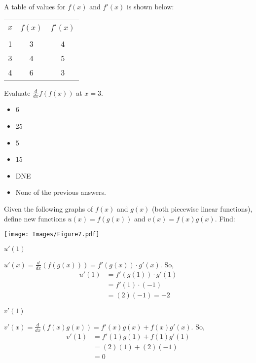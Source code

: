 \documentclass[handout,nooutcomes]{ximera}
\renewenvironment{freeResponse}{
\ifhandout\setbox0\vbox\bgroup\else
\begin{trivlist}\item[\hskip \labelsep\bfseries Solution:\hspace{2ex}]
\fi}
{\ifhandout\egroup\else
\end{trivlist}
\fi}
\newcommand{\ddx}{\frac{d}{dx}}
\begin{document}
\begin{problem}
  A table of values for $f(x)$ and $f'(x)$ is shown below:

  \begin{centering}
    \begin{tabular}{ccc}
      \toprule\\
      $x$ & $f(x)$ & $f'(x)$ \\
      \midrule\\
      1 & 3 & 4\\
      3 & 4 & 5\\
      4 & 6 & 3\\
      \bottomrule
    \end{tabular}
  \end{centering}

  Evaluate $\displaystyle\ddx f(f(x))$ at $x = 3$.
  \begin{itemize}
    \item[(a)] 6
    \item[(b)] 25
    \item[(c)] 5
    \item[(d)] 15
    \item[(e)] DNE
    \item[(f)] None of the previous answers.
  \end{itemize}
\end{problem}

\begin{problem}
  Given the following graphs of $f(x)$ and $g(x)$ (both piecewise
  linear functions), define new functions $u(x) = f(g(x))$ and
  $v(x) = f(x)g(x)$.  Find:

  \begin{image}
    \texttt{[image: Images/Figure7.pdf]}
  \end{image}

  \begin{enumerate}
	
  \item $u'(1)$
    \begin{freeResponse}
      $u'(x) = \ddx(f(g(x))) = f'(g(x)) \cdot g'(x)$.  So,
      \begin{align*}
        u'(1) &= f'(g(1)) \cdot g'(1) \\
              &= f'(1) \cdot (-1) \\
              &= (2)(-1) = -2 
      \end{align*}  
    \end{freeResponse}
		
		
		
	
  \item $v'(1)$
    \begin{freeResponse}
      $v'(x) = \ddx(f(x)g(x)) = f'(x)g(x) + f(x)g'(x)$.  So,
      \begin{align*}
        v'(1) &= f'(1) g(1) + f(1) g'(1) \\
              &= (2)(1) + (2)(-1) \\
              &= 0
      \end{align*}
    \end{freeResponse}
  \end{enumerate}
\end{problem}
\end{document}
